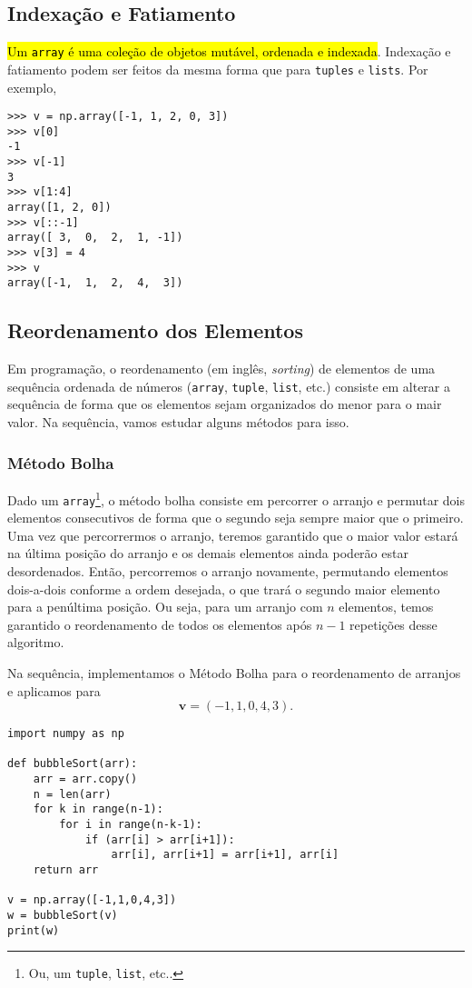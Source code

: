\subsection{Indexação e Fatiamento}\label{cap_arr_sec_arr:ssec:islice}

\hl{Um {\lstinline+array+} é uma coleção de objetos mutável, ordenada e indexada}. Indexação e fatiamento podem ser feitos da mesma forma que para \lstinline+tuples+ e \lstinline+lists+. Por exemplo,
\begin{lstlisting}
>>> v = np.array([-1, 1, 2, 0, 3])
>>> v[0]
-1
>>> v[-1]
3
>>> v[1:4]
array([1, 2, 0])
>>> v[::-1]
array([ 3,  0,  2,  1, -1])
>>> v[3] = 4
>>> v
array([-1,  1,  2,  4,  3])
\end{lstlisting}

\subsection{Reordenamento dos Elementos}

Em programação, o reordenamento (em inglês, \textit{sorting}) de elementos de uma sequência ordenada de números (\lstinline+array+, \lstinline+tuple+, \lstinline+list+, etc.) consiste em alterar a sequência de forma que os elementos sejam organizados do menor para o mair valor. Na sequência, vamos estudar alguns métodos para isso.

\subsubsection{Método Bolha}

Dado um \lstinline+array+\footnote{Ou, um \lstinline+tuple+, \lstinline+list+, etc..}, o método bolha consiste em percorrer o arranjo e permutar dois elementos consecutivos de forma que o segundo seja sempre maior que o primeiro. Uma vez que percorrermos o arranjo, teremos garantido que o maior valor estará na última posição do arranjo e os demais elementos ainda poderão estar desordenados. Então, percorremos o arranjo novamente, permutando elementos dois-a-dois conforme a ordem desejada, o que trará o segundo maior elemento para a penúltima posição. Ou seja, para um arranjo com $n$ elementos, temos garantido o reordenamento de todos os elementos após $n-1$ repetições desse algoritmo.

\begin{ex}
  Na sequência, implementamos o Método Bolha para o reordenamento de arranjos e aplicamos para
  \begin{equation}
    \pmb{v} = (-1, 1, 0, 4, 3).
  \end{equation}
  
\begin{lstlisting}[caption=bubbleSort\_v1.py]
import numpy as np

def bubbleSort(arr):
    arr = arr.copy()
    n = len(arr)
    for k in range(n-1):
        for i in range(n-k-1):
            if (arr[i] > arr[i+1]):
                arr[i], arr[i+1] = arr[i+1], arr[i]
    return arr

v = np.array([-1,1,0,4,3])
w = bubbleSort(v)
print(w)
\end{lstlisting}
\end{ex}

